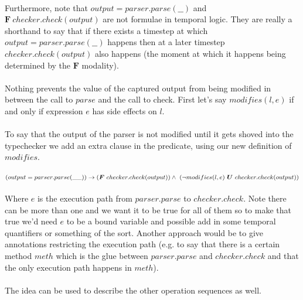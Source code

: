 \documentclass{article}
\begin{document}
\paragraph{}
Furthermore, note that $output = parser.parse(\_\_)$ and $\bm{F}~ checker.check(output)$ are not formulae in temporal logic. They are really a shorthand to say that if there exists a timestep at which $output = parser.parse(\_\_)$ happens then at a later timestep $checker.check(output)$ also happens (the moment at which it happens being determined by the $\bm{F}$ modality).

\paragraph{}
Nothing prevents the value of the captured output from being modified in between the call to $parse$ and the call to check. First let's say $modifies(l, e)$ if and only if expression $e$ has side effects on $l$.

\paragraph{}
To say that the output of the parser is not modified until it gets shoved into the typechecker we add an extra clause in the predicate, using our new definition of $modifies$.

\paragraph{}
$(output = parser.parse(\_\_)) \rightarrow (\bm{F}~ checker.check(output))\\\land~(\neg modifies(l, e)~\bm{U}~checker.check(output))$

\paragraph{}
Where $e$ is the execution path from $parser.parse$ to $checker.check$. Note there can be more than one and we want it to be true for all of them so to make that true we'd need $e$ to be a bound variable and possible add in some temporal quantifiers or something of the sort. Another approach would be to give annotations restricting the execution path (e.g. to say that there is a certain method $meth$ which is the glue between $parser.parse$ and $checker.check$ and that the only execution path happens in $meth$).

\paragraph{}
The idea can be used to describe the other operation sequences  as well.
\end{document}
